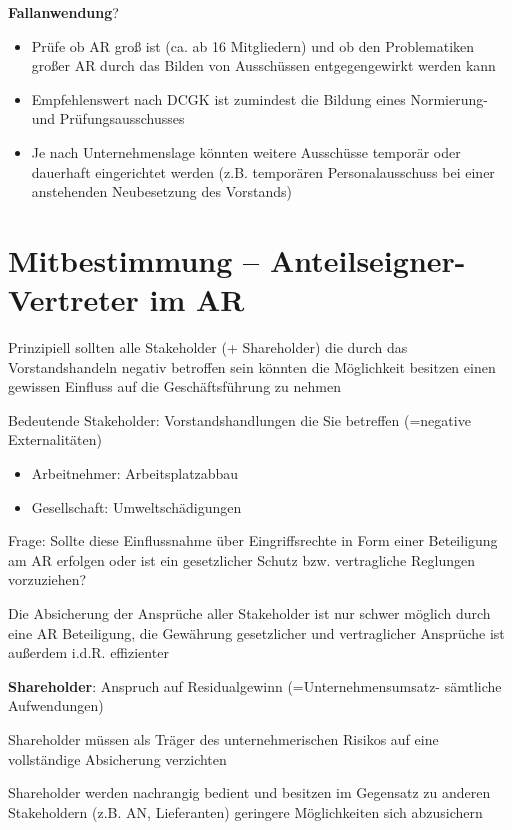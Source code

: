 \documentclass[
]{article}
\providecommand{\tightlist}{%
  \setlength{\itemsep}{0pt}\setlength{\parskip}{0pt}}
\begin{document}
\textbf{Fallanwendung}?

\begin{itemize}
\tightlist
\item
  Prüfe ob AR groß ist (ca. ab 16 Mitgliedern) und ob den Problematiken
  großer AR durch das Bilden von Ausschüssen entgegengewirkt werden kann
\item
  Empfehlenswert nach DCGK ist zumindest die Bildung eines Normierung-
  und Prüfungsausschusses
\item
  Je nach Unternehmenslage könnten weitere Ausschüsse temporär oder
  dauerhaft eingerichtet werden (z.B. temporären Personalausschuss bei
  einer anstehenden Neubesetzung des Vorstands)
\end{itemize}

\hypertarget{mitbestimmung-anteilseigner-vertreter-im-ar}{%
\section{Mitbestimmung -- Anteilseigner-Vertreter im
AR}\label{mitbestimmung-anteilseigner-vertreter-im-ar}}

Prinzipiell sollten alle Stakeholder (+ Shareholder) die durch das
Vorstandshandeln negativ betroffen sein könnten die Möglichkeit besitzen
einen gewissen Einfluss auf die Geschäftsführung zu nehmen

Bedeutende Stakeholder: Vorstandshandlungen die Sie betreffen (=negative
Externalitäten)

\begin{itemize}
\tightlist
\item
  Arbeitnehmer: Arbeitsplatzabbau
\item
  Gesellschaft: Umweltschädigungen
\end{itemize}

Frage: Sollte diese Einflussnahme über Eingriffsrechte in Form einer
Beteiligung am AR erfolgen oder ist ein gesetzlicher Schutz bzw.
vertragliche Reglungen vorzuziehen?

Die Absicherung der Ansprüche aller Stakeholder ist nur schwer möglich
durch eine AR Beteiligung, die Gewährung gesetzlicher und vertraglicher
Ansprüche ist außerdem i.d.R. effizienter

\textbf{Shareholder}: Anspruch auf Residualgewinn (=Unternehmensumsatz-
sämtliche Aufwendungen)

Shareholder müssen als Träger des unternehmerischen Risikos auf eine
vollständige Absicherung verzichten

Shareholder werden nachrangig bedient und besitzen im Gegensatz zu
anderen Stakeholdern (z.B. AN, Lieferanten) geringere Möglichkeiten sich
abzusichern
\end{document}
